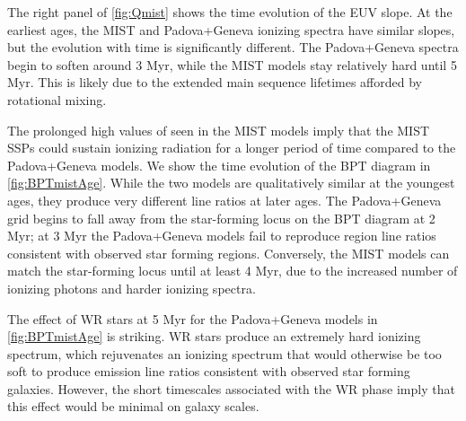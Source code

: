 The right panel of \ref{fig:Qmist} shows the time evolution of the EUV slope. At the earliest ages, the MIST and Padova+Geneva ionizing spectra have similar slopes, but the evolution with time is significantly different. The Padova+Geneva spectra begin to soften around 3 Myr, while the MIST models stay relatively hard until 5 Myr. This is likely due to the extended main sequence lifetimes afforded by rotational mixing.

The prolonged high values of \QH{} seen in the MIST models imply that the MIST SSPs could sustain ionizing radiation for a longer period of time compared to the Padova+Geneva models. We show the time evolution of the BPT diagram in \ref{fig:BPTmistAge}. While the two models are qualitatively similar at the youngest ages, they produce very different line ratios at later ages. The Padova+Geneva grid begins to fall away from the star-forming locus on the BPT diagram at 2 Myr; at 3 Myr the Padova+Geneva models fail to reproduce \hii region line ratios consistent with observed star forming regions. Conversely, the MIST models can match the star-forming locus until at least 4 Myr, due to the increased number of ionizing photons and harder ionizing spectra. 

The effect of WR stars at 5 Myr for the Padova+Geneva models in \ref{fig:BPTmistAge} is striking. WR stars produce an extremely hard ionizing spectrum, which rejuvenates an ionizing spectrum that would otherwise be too soft to produce emission line ratios consistent with observed star forming galaxies. However, the short timescales associated with the WR phase imply that this effect would be minimal on galaxy scales.

